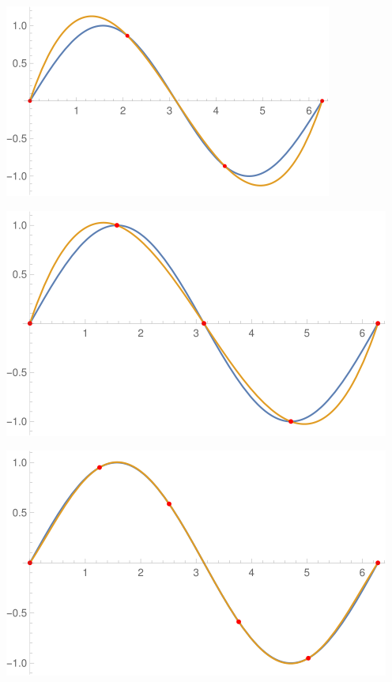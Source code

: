\documentclass[12pt]{article}
\newenvironment{Figure}
  {\par\medskip\noindent\minipage{\linewidth}}
  {\endminipage\par\medskip}
\begin{document}
\begin{multicols*}{2}
    \begin{Figure}
        \includegraphics[width=\linewidth]{Images/SineInterpolation_EvenlySpaced/sin_interpolation_4.png}
    \end{Figure}
    \begin{Figure}
        \includegraphics[width=\linewidth]{Images/SineInterpolation_EvenlySpaced/sin_interpolation_5.png}
    \end{Figure}
    \begin{Figure}
        \includegraphics[width=\linewidth]{Images/SineInterpolation_EvenlySpaced/sin_interpolation_6.png}
    \end{Figure}


\end{multicols*}
\end{document}
